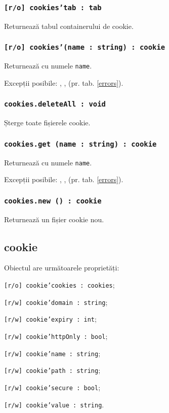 \subsubsection{\texttt{[r/o] cookies'tab : tab}}

Returnează tabul containerului de cookie.

\subsubsection{\texttt{[r/o] cookies'(name : string) : cookie}}

Returnează \cookie{} cu numele \texttt{name}.

Excepții posibile: , ,  (pr. tab. \ref{errors}).

\subsubsection{\texttt{cookies.deleteAll : void}}

Șterge toate fișierele cookie.

\subsubsection{\texttt{cookies.get (name : string) : cookie}}

Returnează \cookie{} cu numele \texttt{name}.

Excepții posibile: , ,  (pr. tab. \ref{errors}).

\subsubsection{\texttt{cookies.new () : cookie}}

Returnează un fișier cookie nou.

\subsection{{\color{orange} cookie}}

Obiectul \cookie{} are următoarele proprietăți:
\begin{icItems}
	\item \texttt{[r/o] cookie'cookies : cookies};
	\item \texttt{[r/w] cookie'domain : string};
	\item \texttt{[r/w] cookie'expiry : int};
	\item \texttt{[r/w] cookie'httpOnly : bool};
	\item \texttt{[r/w] cookie'name : string};
	\item \texttt{[r/w] cookie'path : string};
	\item \texttt{[r/w] cookie'secure : bool};
	\item \texttt{[r/w] cookie'value : string}.
\end{icItems}

